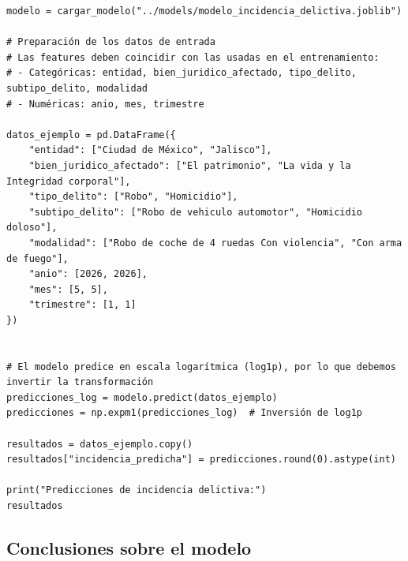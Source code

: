 \begin{lstlisting}
modelo = cargar_modelo("../models/modelo_incidencia_delictiva.joblib")

# Preparación de los datos de entrada
# Las features deben coincidir con las usadas en el entrenamiento:
# - Categóricas: entidad, bien_juridico_afectado, tipo_delito, subtipo_delito, modalidad
# - Numéricas: anio, mes, trimestre

datos_ejemplo = pd.DataFrame({
    "entidad": ["Ciudad de México", "Jalisco"],
    "bien_juridico_afectado": ["El patrimonio", "La vida y la Integridad corporal"],
    "tipo_delito": ["Robo", "Homicidio"],
    "subtipo_delito": ["Robo de vehiculo automotor", "Homicidio doloso"],
    "modalidad": ["Robo de coche de 4 ruedas Con violencia", "Con arma de fuego"],
    "anio": [2026, 2026],
    "mes": [5, 5],
    "trimestre": [1, 1]
})


# El modelo predice en escala logarítmica (log1p), por lo que debemos invertir la transformación
predicciones_log = modelo.predict(datos_ejemplo)
predicciones = np.expm1(predicciones_log)  # Inversión de log1p

resultados = datos_ejemplo.copy()
resultados["incidencia_predicha"] = predicciones.round(0).astype(int)

print("Predicciones de incidencia delictiva:")
resultados
\end{lstlisting}

\begin{table}[ht]
  \centering
  \caption{Predicciones de incidencia delictiva para los casos de ejemplo}
  \label{tab:predicciones-ejemplo}
\end{table}


\subsection{Conclusiones sobre el modelo}

